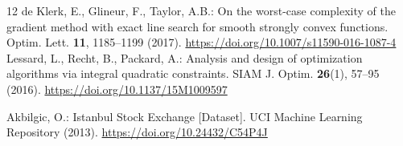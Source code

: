 \documentclass[pdflatex,sn-mathphys-num]{sn-jnl}
\theoremstyle{thmstyleone}
\theoremstyle{thmstyletwo}
\begin{document}
\begin{thebibliography}{12}
de Klerk, E., Glineur, F., Taylor, A.B.:
On the worst-case complexity of the gradient method with exact line search
for smooth strongly convex functions.
Optim. Lett. \textbf{11}, 1185--1199 (2017).
\url{https://doi.org/10.1007/s11590-016-1087-4}
Lessard, L., Recht, B., Packard, A.:
Analysis and design of optimization algorithms via integral quadratic constraints.
SIAM J. Optim. \textbf{26}(1), 57--95 (2016).
\url{https://doi.org/10.1137/15M1009597}

Akbilgic, O.: Istanbul Stock Exchange [Dataset].
UCI Machine Learning Repository (2013).
\url{https://doi.org/10.24432/C54P4J}

\end{thebibliography}
\end{document}
